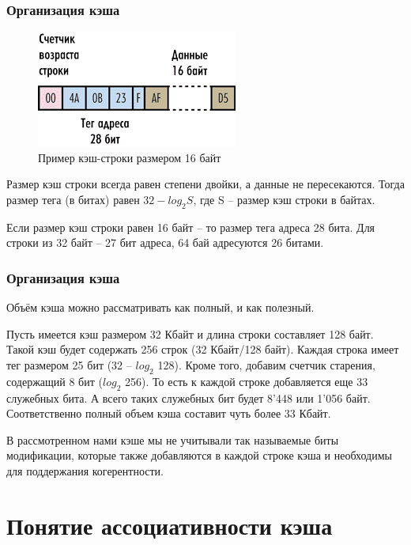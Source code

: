 \documentclass{beamer}
\begin{document}
\begin{frame}
\frametitle{Организация кэша}

\begin{figure}
\includegraphics[scale=0.7]{Pic_2}
\caption{Пример кэш-строки размером 16 байт}
\end{figure}

Размер кэш строки всегда равен степени двойки, а данные не пересекаются. Тогда размер тега (в битах) равен $32 - log_{2} S$, где S -- размер кэш строки в байтах.

Если размер кэш строки равен 16 байт -- то размер тега адреса 28 бита. Для строки из 32 байт -- 27 бит адреса, 64 бай адресуются 26 битами.
\end{frame}


\begin{frame}
\frametitle{Организация кэша}

Объём кэша можно рассматривать как полный, и как полезный.

Пусть имеется кэш размером 32 Кбайт и длина строки составляет 128 байт.  Такой кэш будет содержать 256 строк (32 Кбайт/128 байт). Каждая строка имеет тег размером 25 бит (32 – $log_2$ 128). Кроме того, добавим счетчик старения, содержащий 8 бит ($log_2$ 256). То есть к каждой строке добавляется еще 33 служебных бита. А всего таких служебных бит будет 8'448 или 1'056 байт. Соответственно полный объем кэша составит чуть более 33 Кбайт.

В рассмотренном нами кэше мы не учитывали так называемые биты модификации, которые также добавляются в каждой строке кэша и необходимы для поддержания когерентности.

\end{frame}


\section{Понятие ассоциативности кэша}
\end{document}
